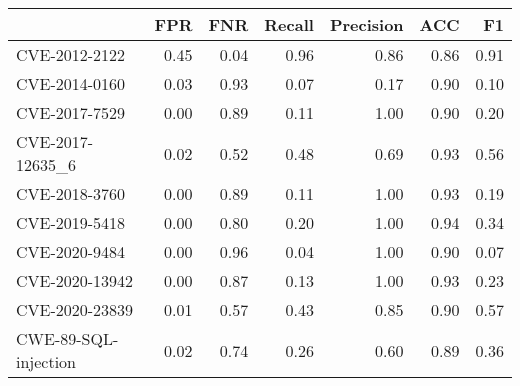 \begin{tabular}{lrrrrrr}
\toprule
{} &  FPR &  FNR &  Recall &  Precision &  ACC &   F1 \\
\midrule
CVE-2012-2122        & 0.45 & 0.04 &    0.96 &       0.86 & 0.86 & 0.91 \\
CVE-2014-0160        & 0.03 & 0.93 &    0.07 &       0.17 & 0.90 & 0.10 \\
CVE-2017-7529        & 0.00 & 0.89 &    0.11 &       1.00 & 0.90 & 0.20 \\
CVE-2017-12635\_6     & 0.02 & 0.52 &    0.48 &       0.69 & 0.93 & 0.56 \\
CVE-2018-3760        & 0.00 & 0.89 &    0.11 &       1.00 & 0.93 & 0.19 \\
CVE-2019-5418        & 0.00 & 0.80 &    0.20 &       1.00 & 0.94 & 0.34 \\
CVE-2020-9484        & 0.00 & 0.96 &    0.04 &       1.00 & 0.90 & 0.07 \\
CVE-2020-13942       & 0.00 & 0.87 &    0.13 &       1.00 & 0.93 & 0.23 \\
CVE-2020-23839       & 0.01 & 0.57 &    0.43 &       0.85 & 0.90 & 0.57 \\
CWE-89-SQL-injection & 0.02 & 0.74 &    0.26 &       0.60 & 0.89 & 0.36 \\
\bottomrule
\end{tabular}

